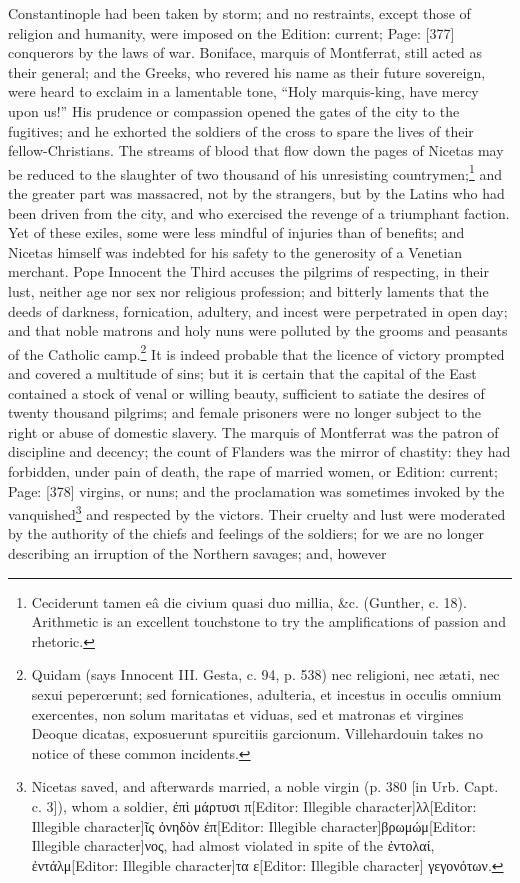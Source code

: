 Constantinople had been taken by storm; and no restraints, except those of religion and humanity, were imposed on the Edition: current; Page: [377] conquerors by the laws of war. Boniface, marquis of Montferrat, still acted as their general; and the Greeks, who revered his name as their future sovereign, were heard to exclaim in a lamentable tone, \texthebrew{“}Holy marquis-king, have mercy upon us!\texthebrew{}” His prudence or compassion opened the gates of the city to the fugitives; and he exhorted the soldiers of the cross to spare the lives of their fellow-Christians. The streams of blood that flow down the pages of Nicetas may be reduced to the slaughter of two thousand of his unresisting countrymen;\footnote{Ceciderunt tamen eâ die civium quasi duo millia, \&c. (Gunther, c. 18). Arithmetic is an excellent touchstone to try the amplifications of passion and rhetoric.} and the greater part was massacred, not by the strangers, but by the Latins who had been driven from the city, and who exercised the revenge of a triumphant faction. Yet of these exiles, some were less mindful of injuries than of benefits; and Nicetas himself was indebted for his safety to the generosity of a Venetian merchant. Pope Innocent the Third accuses the pilgrims of respecting, in their lust, neither age nor sex nor religious profession; and bitterly laments that the deeds of darkness, fornication, adultery, and incest were perpetrated in open day; and that noble matrons and holy nuns were polluted by the grooms and peasants of the Catholic camp.\footnote{Quidam (says Innocent III. Gesta, c. 94, p. 538) nec religioni, nec ætati, nec sexui peperœrunt; sed fornicationes, adulteria, et incestus in occulis omnium exercentes, non solum maritatas et viduas, sed et matronas et virgines Deoque dicatas, exposuerunt spurcitiis garcionum. Villehardouin takes no notice of these common incidents.} It is indeed probable that the licence of victory prompted and covered a multitude of sins; but it is certain that the capital of the East contained a stock of venal or willing beauty, sufficient to satiate the desires of twenty thousand pilgrims; and female prisoners were no longer subject to the right or abuse of domestic slavery. The marquis of Montferrat was the patron of discipline and decency; the count of Flanders was the mirror of chastity: they had forbidden, under pain of death, the rape of married women, or Edition: current; Page: [378] virgins, or nuns; and the proclamation was sometimes invoked by the vanquished\footnote{Nicetas saved, and afterwards married, a noble virgin (p. 380 [in Urb. Capt. c. 3]), whom a soldier, \textgreek{\texthebrew{ἐ}π\texthebrew{ὶ} μάρτυσι π}[Editor: Illegible character]\textgreek{λλ}[Editor: Illegible character]\textgreek{\texthebrew{ῖ}ς \texthebrew{ὀ}νηδ\texthebrew{ὸ}ν \texthebrew{ἐ}π}[Editor: Illegible character]\textgreek{βρωμώμ}[Editor: Illegible character]\textgreek{νος}, had almost violated in spite of the \textgreek{\texthebrew{ἐ}ντολαί, \texthebrew{ἐ}ντάλμ}[Editor: Illegible character]\textgreek{τα ε}[Editor: Illegible character] \textgreek{γεγονότων}.} and respected by the victors. Their cruelty and lust were moderated by the authority of the chiefs and feelings of the soldiers; for we are no longer describing an irruption of the Northern savages; and, however 